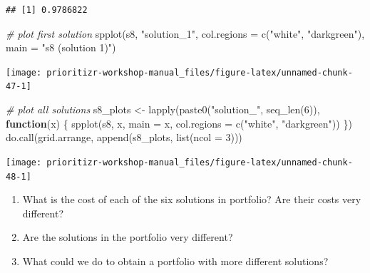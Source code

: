 \documentclass[
  12pt,
]{book}
\makeatletter
\newenvironment{Shaded}{\begin{snugshade}}{\end{snugshade}}
\newcommand{\AttributeTok}[1]{\textcolor[rgb]{0.77,0.63,0.00}{#1}}
\newcommand{\CommentTok}[1]{\textcolor[rgb]{0.56,0.35,0.01}{\textit{#1}}}
\newcommand{\ControlFlowTok}[1]{\textcolor[rgb]{0.13,0.29,0.53}{\textbf{#1}}}
\newcommand{\DecValTok}[1]{\textcolor[rgb]{0.00,0.00,0.81}{#1}}
\newcommand{\FunctionTok}[1]{\textcolor[rgb]{0.00,0.00,0.00}{#1}}
\newcommand{\NormalTok}[1]{#1}
\newcommand{\OtherTok}[1]{\textcolor[rgb]{0.56,0.35,0.01}{#1}}
\newcommand{\StringTok}[1]{\textcolor[rgb]{0.31,0.60,0.02}{#1}}
\providecommand{\tightlist}{%
  \setlength{\itemsep}{0pt}\setlength{\parskip}{0pt}}
\newenvironment{kframe}{%
\medskip{}
\setlength{\fboxsep}{.8em}
 \def\at@end@of@kframe{}%
 \ifinner\ifhmode%
  \def\at@end@of@kframe{\end{minipage}}%
  \begin{minipage}{\columnwidth}%
 \fi\fi%
 \def\FrameCommand##1{\hskip\@totalleftmargin \hskip-\fboxsep
 \colorbox{shadecolor}{##1}\hskip-\fboxsep
     \hskip-\linewidth \hskip-\@totalleftmargin \hskip\columnwidth}%
 \MakeFramed {\advance\hsize-\width
   \@totalleftmargin\z@ \linewidth\hsize
   \@setminipage}}%
 {\par\unskip\endMakeFramed%
 \at@end@of@kframe}
\newenvironment{rmdblock}[1]
  {
  \begin{itemize}
  \renewcommand{\labelitemi}{
    \raisebox{-.7\height}[0pt][0pt]{
      {\setkeys{Gin}{width=3em,keepaspectratio}\texttt{[image: images/\#1]}}
    }
  }
  \setlength{\fboxsep}{1em}
  \begin{kframe}
  \item
  }
  {
  \end{kframe}
  \end{itemize}
  }
\newenvironment{rmdquestion}
  {\begin{rmdblock}{question}}
  {\end{rmdblock}}
\makeatother
\begin{document}
\begin{verbatim}
## [1] 0.9786822
\end{verbatim}

\begin{Shaded}
\begin{Highlighting}[]
\CommentTok{\# plot first solution}
\FunctionTok{spplot}\NormalTok{(s8, }\StringTok{"solution\_1"}\NormalTok{, }\AttributeTok{col.regions =} \FunctionTok{c}\NormalTok{(}\StringTok{"white"}\NormalTok{, }\StringTok{"darkgreen"}\NormalTok{),}
       \AttributeTok{main =} \StringTok{"s8 (solution 1)"}\NormalTok{)}
\end{Highlighting}
\end{Shaded}

\begin{center}\texttt{[image: prioritizr-workshop-manual\_files/figure-latex/unnamed-chunk-47-1]} \end{center}

\clearpage

\begin{Shaded}
\begin{Highlighting}[]
\CommentTok{\# plot all solutions}
\NormalTok{s8\_plots }\OtherTok{\textless{}{-}} \FunctionTok{lapply}\NormalTok{(}\FunctionTok{paste0}\NormalTok{(}\StringTok{"solution\_"}\NormalTok{, }\FunctionTok{seq\_len}\NormalTok{(}\DecValTok{6}\NormalTok{)), }\ControlFlowTok{function}\NormalTok{(x) \{}
  \FunctionTok{spplot}\NormalTok{(s8, x, }\AttributeTok{main =}\NormalTok{ x, }\AttributeTok{col.regions =} \FunctionTok{c}\NormalTok{(}\StringTok{"white"}\NormalTok{, }\StringTok{"darkgreen"}\NormalTok{))}
\NormalTok{\})}
\FunctionTok{do.call}\NormalTok{(grid.arrange, }\FunctionTok{append}\NormalTok{(s8\_plots, }\FunctionTok{list}\NormalTok{(}\AttributeTok{ncol =} \DecValTok{3}\NormalTok{)))}
\end{Highlighting}
\end{Shaded}

\begin{center}\texttt{[image: prioritizr-workshop-manual\_files/figure-latex/unnamed-chunk-48-1]} \end{center}

\begin{rmdquestion}
\begin{enumerate}
\def\labelenumi{\arabic{enumi}.}
\tightlist
\item
  What is the cost of each of the six solutions in portfolio? Are their costs very different?
\item
  Are the solutions in the portfolio very different?
\item
  What could we do to obtain a portfolio with more different solutions?
\end{enumerate}
\end{rmdquestion}
\end{document}
